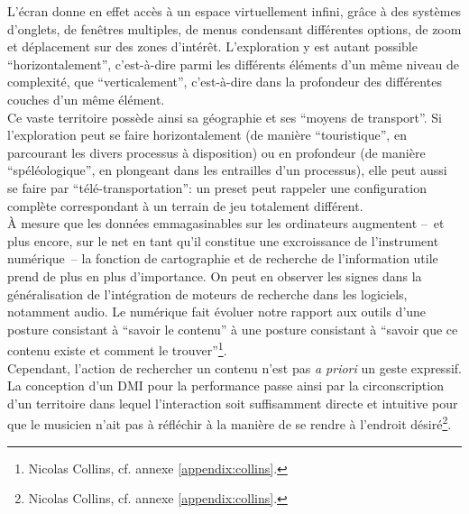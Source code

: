 \noindent L'écran donne en effet accès à un espace virtuellement infini, grâce à des systèmes d'onglets, de fenêtres multiples, de menus condensant différentes options, de zoom et déplacement sur des zones d'intérêt. L'exploration y est autant possible ``horizontalement'', c'est-à-dire parmi les différents éléments d'un même niveau de complexité, que ``verticalement'', c'est-à-dire dans la profondeur des différentes couches d'un même élément.\\
\indent Ce vaste territoire possède ainsi sa géographie et ses ``moyens de transport''. Si l'exploration peut se faire horizontalement (de manière ``touristique'', en parcourant les divers processus à disposition) ou en profondeur (de manière ``spéléologique'', en plongeant dans les entrailles d'un processus), elle peut aussi se faire par ``télé-transportation'': un preset peut rappeler une configuration complète correspondant à un terrain de jeu totalement différent.\\
\indent À mesure que les données emmagasinables sur les ordinateurs augmentent --~et plus encore, sur le net en tant qu'il constitue une excroissance de l'instrument numérique~-- la fonction de cartographie et de recherche de l'information utile prend de plus en plus d'importance. On peut en observer les signes dans la généralisation de l'intégration de moteurs de recherche dans les logiciels, notamment audio. Le numérique fait évoluer notre rapport aux outils d'une posture consistant à ``savoir le contenu'' à une posture consistant à ``savoir que ce contenu existe et comment le trouver''\footnote{ Nicolas Collins, cf. annexe \ref{appendix:collins}.}.\\
\indent Cependant, l'action de rechercher un contenu n'est pas \textit{a priori} un geste expressif. La conception d'un \gls{DMI} pour la performance passe ainsi par la circonscription d'un territoire dans lequel l'interaction soit suffisamment directe et intuitive pour que le musicien n'ait pas à réfléchir à la manière de se rendre à l'endroit désiré\footnote{ Nicolas Collins, cf. annexe \ref{appendix:collins}.}.

